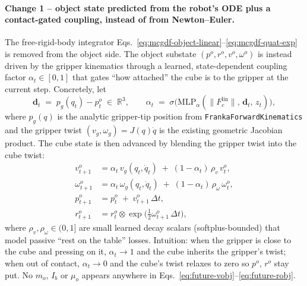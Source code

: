 \documentclass[11pt]{article}
\begin{document}
\paragraph{Change 1 -- object state predicted from the robot's ODE
plus a contact-gated coupling, instead of from Newton--Euler.}
The free-rigid-body integrator
Eqs.~\eqref{eq:mcgdf-object-linear}--\eqref{eq:mcgdf-quat-exp} is removed
from the object side. The object substate
$(p^o, r^o, v^o, \omega^o)$ is instead driven by the gripper kinematics
through a learned, state-dependent coupling factor
$\alpha_t \in [0,1]$ that gates ``how attached'' the cube is to the
gripper at the current step. Concretely, let
\begin{equation}
  \mathbf{d}_t \;=\; p_g(q_t) - p^o_t \;\in\;\mathbb{R}^3,
  \qquad
  \alpha_t \;=\; \sigma\!\bigl(\mathrm{MLP}_\alpha(\|F_c^{\mathrm{lin}}\|,\,\mathbf{d}_t,\,z_t)\bigr),
  \label{eq:future-coupling-alpha}
\end{equation}
where $p_g(q)$ is the analytic gripper-tip position from
\texttt{FrankaForwardKinematics} and the gripper twist
$(v_g, \omega_g) = J(q)\dot q$ is the existing geometric Jacobian
product. The cube state is then advanced by blending the gripper twist
into the cube twist:
\begin{align}
  v^o_{t+1}      &= \alpha_t\,v_g(q_t,\dot q_t)
                   \;+\; (1-\alpha_t)\,\rho_v\,v^o_t,
                   \label{eq:future-vobj}\\
  \omega^o_{t+1} &= \alpha_t\,\omega_g(q_t,\dot q_t)
                   \;+\; (1-\alpha_t)\,\rho_\omega\,\omega^o_t,
                   \label{eq:future-womega}\\
  p^o_{t+1}      &= p^o_t \;+\; v^o_{t+1}\,\Delta t,
                   \label{eq:future-pobj}\\
  r^o_{t+1}      &= r^o_t \otimes \exp\!\bigl(\tfrac{1}{2}\omega^o_{t+1}\,\Delta t\bigr),
                   \label{eq:future-robj}
\end{align}
where $\rho_v,\rho_\omega\in(0,1]$ are small learned decay scalars
(softplus-bounded) that model passive ``rest on the table'' losses.
Intuition: when the gripper is close to the cube and pressing on it,
$\alpha_t\!\to\!1$ and the cube inherits the gripper's twist; when out
of contact, $\alpha_t\!\to\!0$ and the cube's twist relaxes to zero so
$p^o$, $r^o$ stay put. No $m_o$, $I_b$ or $\mu_o$ appears anywhere in
Eqs.~\eqref{eq:future-vobj}--\eqref{eq:future-robj}.
\end{document}
